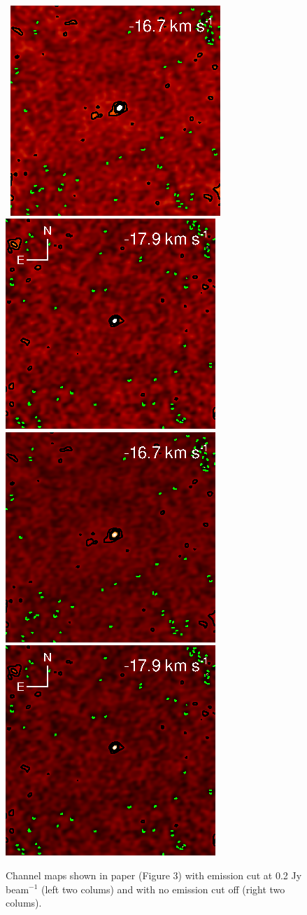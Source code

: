 \documentclass[preprint]{aastex}
\begin{document}
\begin{figure}
{          }
\\
\mbox{
          \includegraphics[]{test40.ps}
          \includegraphics[]{test41.ps}
          \includegraphics[]{test_40.ps}
          \includegraphics[]{test_41.ps}
          }
          \caption{Channel maps shown in paper (Figure 3) with emission cut at 0.2 Jy beam${}^{-1}$ (left two colums) and with no emission cut off (right two colums).}
\end{figure}
\end{document}

